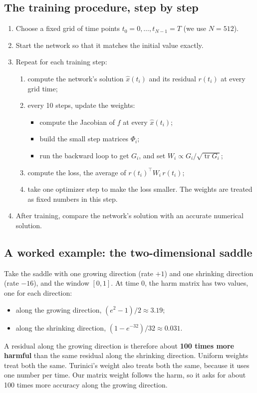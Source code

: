 \documentclass[11pt,a4paper]{article}
\begin{document}
\subsection{The training procedure, step by step}
\begin{enumerate}
\item Choose a fixed grid of time points $t_0=0,\dots,t_{N-1}=T$ (we use $N=512$).
\item Start the network so that it matches the initial value exactly.
\item Repeat for each training step:
  \begin{enumerate}
  \item compute the network's solution $\hat x(t_i)$ and its residual $r(t_i)$ at every
    grid time;
  \item every 10 steps, update the weights:
    \begin{itemize}
    \item compute the Jacobian of $f$ at every $\hat x(t_i)$;
    \item build the small step matrices $\Phi_i$;
    \item run the backward loop to get $G_i$, and set $W_i \propto G_i/\sqrt{\operatorname{tr}G_i}$;
    \end{itemize}
  \item compute the loss, the average of $r(t_i)^{\top}W_i\,r(t_i)$;
  \item take one optimizer step to make the loss smaller. The weights are treated as fixed
    numbers in this step.
  \end{enumerate}
\item After training, compare the network's solution with an accurate numerical solution.
\end{enumerate}

\subsection{A worked example: the two-dimensional saddle}
Take the saddle with one growing direction (rate $+1$) and one shrinking direction (rate
$-16$), and the window $[0,1]$. At time $0$, the harm matrix has two values, one for each
direction:
\begin{itemize}
\item along the growing direction, $(e^{2}-1)/2 \approx 3.19$;
\item along the shrinking direction, $(1-e^{-32})/32 \approx 0.031$.
\end{itemize}
A residual along the growing direction is therefore about \textbf{100 times more harmful}
than the same residual along the shrinking direction. Uniform weights treat both the same.
Turinici's weight also treats both the same, because it uses one number per time. Our
matrix weight follows the harm, so it asks for about 100 times more accuracy along the
growing direction.
\end{document}
